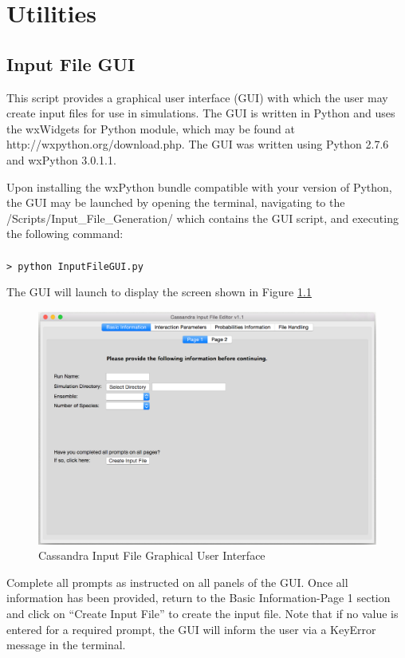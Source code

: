 \chapter{Utilities}

\section{Input File GUI} 
\label{Sec:GUI}
This script provides a graphical user interface (GUI) with which the user 
may create input files for use in simulations.  The GUI is written 
in Python and uses the wxWidgets for Python module, which may be found at
http://wxpython.org/download.php. The GUI was written using 
Python 2.7.6 and wxPython 3.0.1.1.

Upon installing the wxPython bundle compatible with your version of 
Python, the GUI may be launched by opening
the terminal, navigating to the /Scripts/Input\_File\_Generation/
which contains the GUI script, and executing the following command:  \\ \\
%
\texttt{> python InputFileGUI.py}
%

The GUI will launch to display the screen shown in Figure \ref{fig:GUIscreenshot}

\begin{figure}[h]
 \centering
 \includegraphics[width=\textwidth]{GUI_screenshot.eps}
 \caption{Cassandra Input File Graphical User Interface}
 \label{fig:GUIscreenshot}
\end{figure}

Complete all prompts as instructed on all panels of the GUI. 
Once all information has been provided, return to the Basic Information-Page 1 
section and click on ``Create Input File'' to create the input file. Note that if no 
value is entered for a required prompt, the GUI will inform the user 
via a KeyError message in the terminal.

